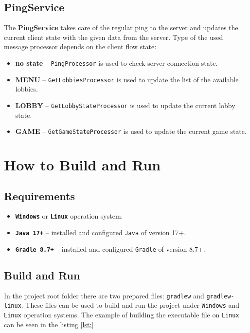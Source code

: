 \documentclass[english, sem, kiv, he, iso690alph, pdf, viewonly]{fasthesis}
\begin{document}
\subsection{PingService}

The \textbf{PingService} takes care of the regular ping to the server and updates the current client state with the given data from the server. Type of the used message processor depends on the client flow state:

\begin{itemize}
	\item \textbf{no state} -- \texttt{PingProcessor} is used to check server connection state.
	\item \textbf{MENU} -- \texttt{GetLobbiesProcessor} is used to update the list of the available lobbies.
	\item \textbf{LOBBY} -- \texttt{GetLobbyStateProcessor} is used to update the current lobby state.
	\item \textbf{GAME} -- \texttt{GetGameStateProcessor} is used to update the current game state.
\end{itemize}

\section{How to Build and Run}

\subsection{Requirements}

\begin{itemize}
	\item \textbf{\texttt{Windows}} or \textbf{\texttt{Linux}} operation system.
	\item \textbf{\texttt{Java 17+}} -- installed and configured \texttt{Java} of version 17+.
	\item \textbf{\texttt{Gradle 8.7+}} -- installed and configured \texttt{Gradle} of version 8.7+.
\end{itemize}

\subsection{Build and Run}
In the project root folder there are two prepared files: \texttt{gradlew} and \texttt{gradlew-linux}. These files can be used to build and run the project under \texttt{Windows} and \texttt{Linux} operation systems. The example of building the executable file on \texttt{Linux} can be seen in the listing \ref{lst:}
\end{document}
